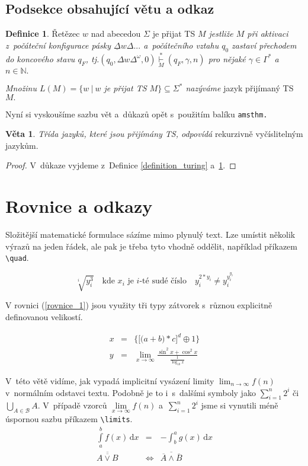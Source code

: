 \documentclass[a4paper,11pt,twocolumn]{article}
\theoremstyle{definition}
\newtheorem{definition}{Definice}
\newtheorem{sentence}{Věta}
\begin{document}
\subsection{Podsekce obsahující větu a odkaz}
\begin{definition}
\label{definition_retezec}
Řetězec $w$ nad abecedou $\Sigma$ je přijat TS \emph{ $M$ jestliže $M$ při aktivaci z~počáteční konfigurace pásky ${\underline{\Delta}w\Delta...}$ a~počátečního vztahu $q_0$ zastaví přechodem do koncového stavu $q_F$, tj.${(q_0,\Delta w\Delta^\omega,0)\underset{M}{\overset{\ast}{\vdash}}(q_F, \gamma, n)}$ pro nějaké ${\gamma \in \Gamma^\ast}$ a~${n \in \mathbb{N}.}$}

\emph{Množinu ${L(M)=\{w\:|\:w}$ je přijat TS $M{\}\subseteq\Sigma^\ast}$ nazýváme} jazyk přijímaný TS ${M.}$
\end{definition}

Nyní si vyskoušíme sazbu vět a~důkazů opět s~použitím balíku \texttt{amsthm.}
\begin{sentence}
\emph{Třída jazyků, které jsou přijímány TS, odpovídá} rekurzivně vyčíslitelným jazykům.
\end{sentence}
\begin{proof}
V~důkaze vyjdeme z~Definice \ref{definition_turing} a~\ref{definition_retezec}.
\end{proof}
\section{Rovnice a odkazy}
Složitější matematické formulace sázíme mimo plynulý text. Lze umístit několik výrazů na jeden řádek, ale pak je třeba tyto vhodně oddělit, například příkazem \verb|\quad|.

$$
		\sqrt[i]{y^3_i}
		\quad
		\text{kde } x_i \text{ je } i \text{-té sudé číslo}
		\quad
		y_i^{2*y_i}\neq y_i^{y_i^{y_i}}
$$

V rovnici (\ref{rovnice_1}) jsou využity tři typy zátvorek s~různou explicitně definovanou velikostí.

\begin{eqnarray}
\label{rovnice_1}
 x & = & \bigg\{\Big[\big(a + b\big) * c\Big]^d \oplus 1 \bigg\} \\
y & = & \lim_{x\to\infty} \frac{\sin^2x + \cos^2x}{\frac{1}{\log_{10}x}} \nonumber
\end{eqnarray}

V~této větě vidíme, jak vypadá implicitní vysázení limity $ \lim_{n\to\infty} f(n) $ v~normálním
	odstavci textu. Podobně je to i~s~dalšími symboly jako $ \sum^n_{i=1}2^i $ či
	$ \bigcup_{A \in \mathcal{B}}A $. V~případě vzorců $ \lim\limits_{x\to\infty} f(n) $ a~$\sum\limits^n_{i=1}2^i$ jsme si vynutili méně úspornou sazbu příkazem \verb|\limits|.
\begin{eqnarray}
		\int\limits^b_a f(x) \, \mathrm{d}x & = & - \int^a_b g(x) \, \mathrm{d}x \\
		\overline{\overline{A \vee B}} & \Leftrightarrow & \overline{\overline{A} \wedge \overline{B}}
	\end{eqnarray}
\end{document}
